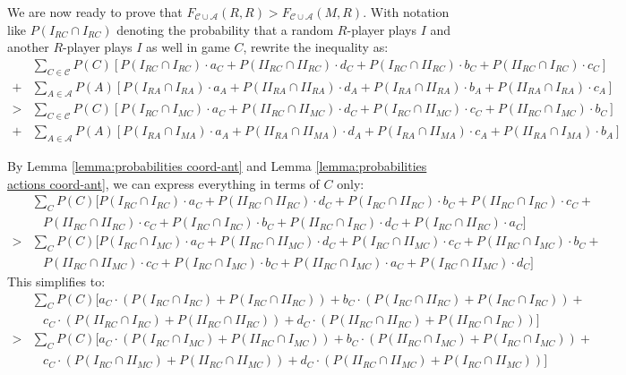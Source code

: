 \documentclass[fleqn,reqno,11pt]{article}
\begin{document}
\noindent We are now ready to prove that
$F_{\mathcal{C}\cup\mathcal{A}}(R,R)>F_{\mathcal{C}\cup\mathcal{A}}(M,R)$. With notation like
$P(I_{RC} \cap I_{RC})$ denoting the probability that a random $R$-player plays $I$ and another
$R$-player plays $I$ as well in game $C$, rewrite the inequality as:
\begin{align*}
  & \sum_{C \in \mathcal{C}}P(C)[P(I_{RC}\cap I_{RC})\cdot a_{C}+P(II_{RC}\cap II_{RC})\cdot
  d_{C}+P(I_{RC}\cap II_{RC})\cdot b_{C}+P(II_{RC}\cap I_{RC})\cdot c_{C}] 
  \\ + & \sum_{A \in
    \mathcal{A}}P(A)[P(I_{RA}\cap I_{RA})\cdot a_{A}+P(II_{RA}\cap II_{RA})\cdot
  d_{A}+P(I_{RA}\cap II_{RA})\cdot b_{A}+P(II_{RA}\cap I_{RA})\cdot c_{A}]\\
  > & \sum_{C \in
    \mathcal{C}}P(C)[P(I_{RC}\cap I_{MC})\cdot a_{C}+P(II_{RC}\cap II_{MC})\cdot
  d_{C}+P(I_{RC}\cap II_{MC})\cdot c_{C}+P(II_{RC}\cap I_{MC})\cdot b_{C}] \\
   + & \sum_{A \in
    \mathcal{A}}P(A)[P(I_{RA}\cap I_{MA})\cdot a_{A}+P(II_{RA}\cap II_{MA})\cdot
  d_{A}+P(I_{RA}\cap II_{MA})\cdot c_{A}+P(II_{RA}\cap I_{MA})\cdot b_{A}]
\end{align*}


\noindent By Lemma \ref{lemma:probabilities coord-ant} and Lemma \ref{lemma:probabilities
  actions coord-ant}, we can express everything in terms of $C$ only:
\begin{align*}
  & \textstyle{\sum_{C}} P(C)[P(I_{RC}\cap I_{RC})\cdot a_{C}+P(II_{RC}\cap II_{RC})\cdot d_{C}+P(I_{RC}\cap
  II_{RC})\cdot b_{C}+P(II_{RC}\cap I_{RC})\cdot c_{C} + \\
  & \ \ \ \ P(II_{RC}\cap II_{RC})\cdot c_{C}+P(I_{RC}\cap I_{RC})\cdot b_{C}+P(II_{RC}\cap
  I_{RC})\cdot d_{C}+P(I_{RC}\cap
  II_{RC})\cdot a_{C}] \\
  > & \textstyle{\sum_{C}}P(C)[P(I_{RC}\cap I_{MC})\cdot a_{C}+P(II_{RC}\cap II_{MC})\cdot
  d_{C}+P(I_{RC}\cap II_{MC})\cdot c_{C}+P(II_{RC}\cap I_{MC})\cdot b_{C} + \\
  & \ \ \ \ P(II_{RC}\cap II_{MC})\cdot c_{C}+P(I_{RC}\cap I_{MC})\cdot b_{C}+P(II_{RC}\cap
  I_{MC})\cdot a_{C}+P(I_{RC}\cap II_{MC})\cdot d_{C}]
\end{align*}
This simplifies to:
\begin{align*}
  & \textstyle{\sum_{C}}P(C)[a_{C} \cdot (P(I_{RC}\cap I_{RC}) + P(I_{RC}\cap II_{RC})) + b_{C}
  \cdot (P(I_{RC}\cap II_{RC}) + P(I_{RC}\cap I_{RC})) + 
\\ & \ \ \ \ c_{C} \cdot
  (P(II_{RC}\cap I_{RC}) +P(II_{RC}\cap II_{RC})) + d_{C} \cdot (P(II_{RC}\cap
  II_{RC})+P(II_{RC}\cap I_{RC}))] 
\\ > & \textstyle{\sum_{C}}P(C)[a_{C} \cdot (P(I_{RC}\cap
  I_{MC})+P(II_{RC}\cap I_{MC})) + b_{C} \cdot (P(II_{RC}\cap I_{MC})+P(I_{RC}\cap I_{MC})) + \\
  & \ \ \ \ c_{C} \cdot (P(I_{RC}\cap II_{MC})+P(II_{RC}\cap II_{MC})) + d_{C} \cdot (P(II_{RC}\cap
  II_{MC})+P(I_{RC}\cap II_{MC}))]
\end{align*}
\end{document}
